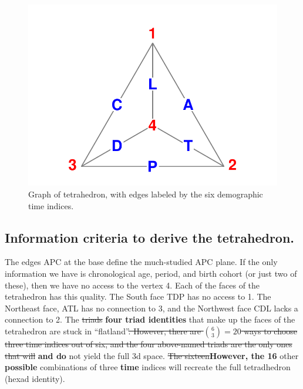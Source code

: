 \documentclass[11pt,oneside,a4paper]{article} %
\begin{document}
\begin{figure}[h!]
\centering
\caption{Graph of tetrahedron, with edges labeled by the six demographic time
indices.}
\label{fig:tet}
\includegraphics[scale=1]{Figures/TetraHedronVerticesEdges.pdf}
\end{figure}

\subsection*{Information criteria to derive the tetrahedron.}
The edges APC at the base define the much-studied APC plane. If the only
information we have is chronological age, period, and birth cohort (or just two
of these), then we have no access to the vertex 4. Each of the faces of the
tetrahedron has this quality. The South face TDP has no access to 1.
The Northeast face, ATL has no connection to 3, and the Northwest face
CDL lacks a connection to 2. The \sout{triads }\textbf{four triad identities }that make up the faces of
the tetrahedron are stuck in ``flatland''\sout{. However, there are $\binom{6}{3}=20$ ways to choose three time indices out of six, and the four
above-named triads are the only ones that will} \textbf{and do }not yield the full 3d
space. \sout{The sixteen}\textbf{However, the 16} other \textbf{possible }combinations of three \textbf{time }indices will recreate the full tetradhedron (hexad identity).



\end{document}
